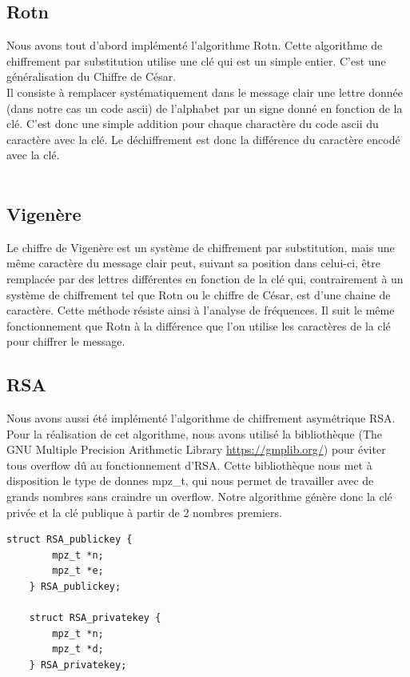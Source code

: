         \subsection{Rotn}
        Nous avons tout d’abord implémenté l’algorithme Rotn.
        Cette algorithme de chiffrement par substitution utilise une clé qui est un simple entier.
        C’est une généralisation du Chiffre de César. \\
        Il consiste à remplacer systématiquement dans le message clair une lettre donnée (dans notre cas un code ascii) de l'alphabet par un signe donné en fonction de la clé. C’est donc une simple addition pour chaque charactère du code ascii du caractère avec la clé.
        Le déchiffrement est donc la différence du caractère encodé avec la clé. \\ \\

        \subsection{Vigenère}
            Le chiffre de Vigenère est un système de chiffrement par substitution, mais une même caractère du message clair peut, suivant sa position dans celui-ci, être remplacée par des lettres différentes en fonction de la clé qui, contrairement à un système de chiffrement tel que Rotn ou le chiffre de César, est d’une chaine de caractère. Cette méthode résiste ainsi à l'analyse de fréquences. Il suit le même fonctionnement que Rotn à la différence que l’on utilise les caractères de la clé pour chiffrer le message. \\
        
        \newpage

        \subsection{RSA}
        Nous avons aussi été implémenté l’algorithme de chiffrement asymétrique RSA. Pour la réalisation de cet algorithme, nous avons utilisé la bibliothèque (The GNU Multiple Precision Arithmetic Library \url{https://gmplib.org/}) pour éviter tous overflow dû au fonctionnement d’RSA. Cette bibliothèque nous met à disposition le type de donnes mpz\_t, qui nous permet de travailler avec de grands nombres sans craindre un overflow.
        Notre algorithme génère donc la clé privée et la clé publique à partir de 2 nombres premiers.

        \begin{lstlisting}[style=CStyle]
    struct RSA_publickey {
        mpz_t *n;
        mpz_t *e;
    } RSA_publickey;
    
    struct RSA_privatekey {
        mpz_t *n;
        mpz_t *d;
    } RSA_privatekey;
		\end{lstlisting}	
		
